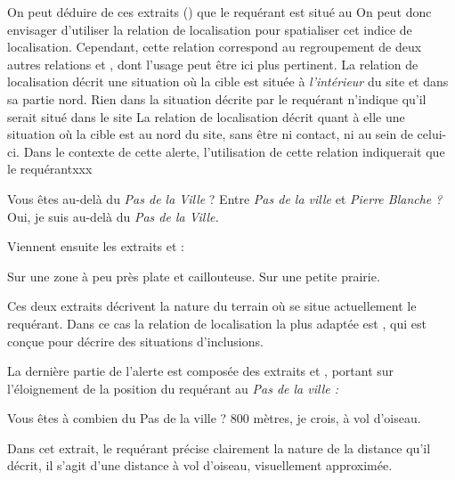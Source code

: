 On peut déduire de ces extraits () que le requérant
est situé au
%
On peut donc envisager d'utiliser la relation de localisation
 pour spatialiser cet indice de
localisation. Cependant, cette relation correspond au regroupement de
deux autres relations  et
, dont l'usage peut être ici plus
pertinent.
%
La relation de localisation 
décrit une situation où la cible est située à \emph{l'intérieur} du
site et dans sa partie nord.
%
Rien dans la situation décrite par le requérant n'indique qu'il serait
situé dans le site
%
La relation de localisation  décrit
quant à elle une situation où la cible est au nord du site, sans être
ni contact, ni au sein de celui-ci.
%
Dans le contexte de cette alerte, l'utilisation de cette relation
indiquerait que le requérantxxx





\begin{dialogue}
  \Sec {} Vous êtes au-delà du \emph{Pas de la Ville} ?
   Entre \emph{Pas de la ville} et \emph{Pierre Blanche ?}
  \Req {} Oui, je suis au-delà du \emph{Pas de la Ville.}
\end{dialogue}
%



Viennent ensuite les extraits  et  :
%
\begin{dialogue}
  \Req {} Sur une zone à peu près plate et
  caillouteuse.  Sur une petite prairie.
\end{dialogue}
%
Ces deux extraits décrivent la nature du terrain où se situe
actuellement le requérant. Dans ce cas la relation de localisation la
plus adaptée est , qui est conçue pour
décrire des situations d'inclusions.


La dernière partie de l'alerte est composée des extraits  et
, portant sur l'éloignement de la position du requérant au
\emph{Pas de la ville :}
%
\begin{dialogue}
  \Sec {} Vous êtes à combien du Pas de la ville ?
  \Req {}  800 mètres, je crois, à vol d'oiseau.
\end{dialogue}
%
Dans cet extrait, le requérant précise clairement la nature de la
distance qu'il décrit, il s'agit d'une distance à vol d'oiseau,
visuellement approximée.

